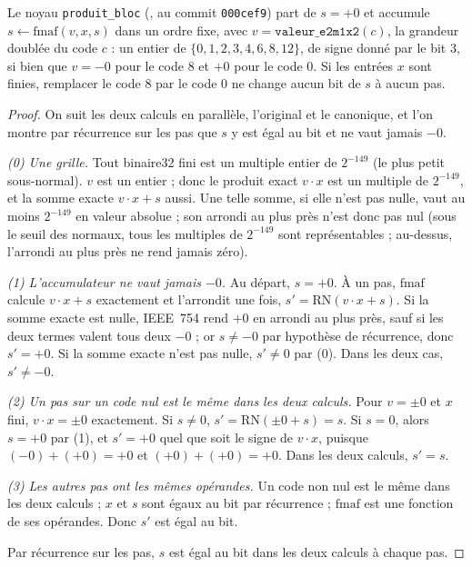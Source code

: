 \begin{proposition}\label{t3syn:prop:a1}
Le noyau \texttt{produit\_bloc} (, au commit \texttt{000cef9}) part de $s = +0$ et accumule $s \leftarrow \mathrm{fmaf}(v, x, s)$ dans un ordre fixe, avec $v = \texttt{valeur\_e2m1x2}(c)$, la grandeur doublée du code $c$ : un entier de $\{0, 1, 2, 3, 4, 6, 8, 12\}$, de signe donné par le bit 3, si bien que $v = -0$ pour le code 8 et $+0$ pour le code 0. Si les entrées $x$ sont finies, remplacer le code 8 par le code 0 ne change aucun bit de $s$ à aucun pas.
\end{proposition}

\begin{proof}
On suit les deux calculs en parallèle, l'original et le canonique, et l'on montre par récurrence sur les pas que $s$ y est égal au bit et ne vaut jamais $-0$.

\emph{(0) Une grille.} Tout binaire32 fini est un multiple entier de $2^{-149}$ (le plus petit sous-normal). $v$ est un entier ; donc le produit exact $v \cdot x$ est un multiple de $2^{-149}$, et la somme exacte $v\cdot x + s$ aussi. Une telle somme, si elle n'est pas nulle, vaut au moins $2^{-149}$ en valeur absolue ; son arrondi au plus près n'est donc pas nul (sous le seuil des normaux, tous les multiples de $2^{-149}$ sont représentables ; au-dessus, l'arrondi au plus près ne rend jamais zéro).

\emph{(1) L'accumulateur ne vaut jamais $-0$.} Au départ, $s = +0$. À un pas, $\mathrm{fmaf}$ calcule $v \cdot x + s$ exactement et l'arrondit une fois, $s' = \mathrm{RN}(v\cdot x + s)$. Si la somme exacte est nulle, IEEE~754 rend $+0$ en arrondi au plus près, sauf si les deux termes valent tous deux $-0$ \parencite{ieee754} ; or $s \ne -0$ par hypothèse de récurrence, donc $s' = +0$. Si la somme exacte n'est pas nulle, $s' \ne 0$ par (0). Dans les deux cas, $s' \ne -0$.

\emph{(2) Un pas sur un code nul est le même dans les deux calculs.} Pour $v = \pm 0$ et $x$ fini, $v \cdot x = \pm 0$ exactement. Si $s \ne 0$, $s' = \mathrm{RN}(\pm 0 + s) = s$. Si $s = 0$, alors $s = +0$ par (1), et $s' = +0$ quel que soit le signe de $v\cdot x$, puisque $(-0) + (+0) = +0$ et $(+0) + (+0) = +0$. Dans les deux calculs, $s' = s$.

\emph{(3) Les autres pas ont les mêmes opérandes.} Un code non nul est le même dans les deux calculs ; $x$ et $s$ sont égaux au bit par récurrence ; $\mathrm{fmaf}$ est une fonction de ses opérandes. Donc $s'$ est égal au bit.

Par récurrence sur les pas, $s$ est égal au bit dans les deux calculs à chaque pas.
\end{proof}

